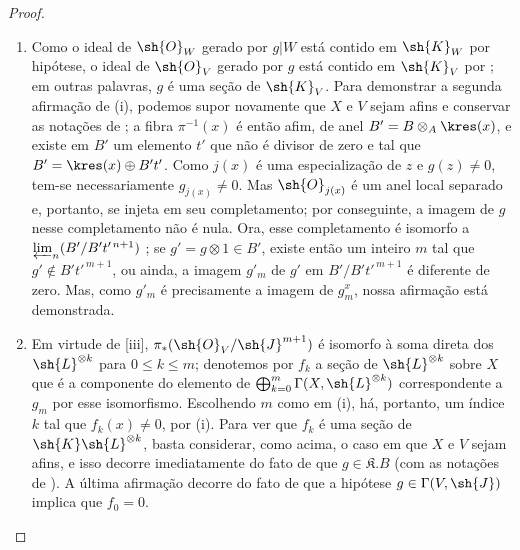 \documentclass[oneside,10pt]{amsart}
\renewcommand{\leq}{\leqslant}
\begin{document}
\begin{proof}
\begin{enumerate}
    \item[\rm{(i)}] Como o ideal de $\sh{O}_W$ gerado por $g|W$ está contido em $\sh{K}_W$ por hipótese, o ideal de $\sh{O}_V$ gerado por $g$ está contido em $\sh{K}_V$ por ; em outras palavras, $g$ é uma seção de $\sh{K}_V$.
        Para demonstrar a segunda afirmação de (i), podemos supor novamente que $X$ e $V$ sejam afins e conservar as notações de ;
        a fibra $\pi^{-1}(x)$ é então afim, de anel $B'=B\otimes_A\kres(x)$, e existe em $B'$ um elemento $t'$ que não é divisor de zero e tal que $B'=\kres(x)\oplus B't'$.
        Como $j(x)$ é uma especialização de $z$ e $g(z)\neq0$, tem-se necessariamente $g_{j(x)}\neq0$.
        Mas $\sh{O}_{j(x)}$ é um anel local separado  e, portanto, se injeta em seu completamento; por conseguinte, a imagem de $g$ nesse completamento não é nula.
        Ora, esse completamento é isomorfo a $\varprojlim_n(B'/B't'^{\,n+1})$ ;
        se $g'=g\otimes1\in B'$, existe então um inteiro $m$ tal que $g'\notin B't'^{\,m+1}$, ou ainda, a imagem $g'_m$ de $g'$ em $B'/B't'^{\,m+1}$ é diferente de zero.
        Mas, como $g'_m$ é precisamente a imagem de $g_m^x$, nossa afirmação está demonstrada.
    \item[\rm{(ii)}] Em virtude de [iii], $\pi_*(\sh{O}_V/\sh{J}^{m+1})$ é isomorfo à soma direta dos $\sh{L}^{\otimes k}$ para $0\leq k\leq m$;
        denotemos por $f_k$ a seção de $\sh{L}^{\otimes k}$ sobre $X$ que é a componente do elemento de $\bigoplus_{k=0}^m\Gamma(X,\sh{L}^{\otimes k})$ correspondente a $g_m$ por esse isomorfismo.
        Escolhendo $m$ como em (i), há, portanto, um índice $k$ tal que $f_k(x)\neq0$, por (i).
        Para ver que $f_k$ é uma seção de $\sh{K}\sh{L}^{\otimes k}$, basta considerar, como acima, o caso em que $X$ e $V$ sejam afins, e isso decorre imediatamente do fato de que $g\in\mathfrak{K}.B$ (com as notações de ).
        A última afirmação decorre do fato de que a hipótese $g\in\Gamma(V,\sh{J})$ implica que $f_0=0$.
\end{enumerate}
\end{proof}
\end{document}
